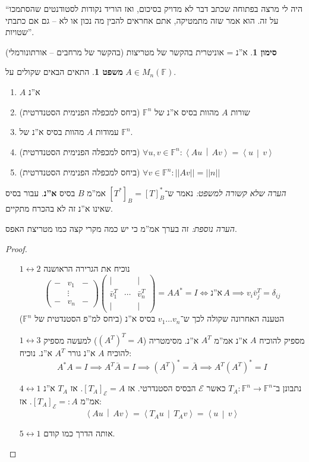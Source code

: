 \documentclass[a4paper]{article}
\newcommand\ec    {\mathcal{E}}
\newcommand\ra    {\rangle}
\newcommand\la    {\langle}
\newcommand\lra       {\leftrightarrow}
\newcommand\F         {\mathbb{F}}
\newcommand\co        {\colon}
\newcommand\pms[1]    {\begin{pmatrix}
		#1
\end{pmatrix}}
\newcommand\norm[1]   {\left \vert \left \vert #1 \right \vert \right \vert}
\newcommand\mut [2]   {\left \la #1 \,\middle|\, #2 \right \ra}
\newcommand\dg        {\delta}
\theoremstyle{definition}
\newtheorem{Theorem}{\color{myblue}משפט}
\newtheorem{Notion}{\color{myred}סימון}
\newcommand\theo  [1] {\begin{Theorem}#1\end{Theorem}}
\newcommand\noti  [1] {\begin{Notion}#1\end{Notion}}
\begin{document}
	``היה לי מרצה בפתוחה שכתב דבר לא מדויק בסיכום, ואז הוריד נקודות לסטודנטים שהסתמכו על זה. הוא אמר שזה מתמטיקה, אתם אחראים להבין מה נכון או לא – גם אם כתבתי שטויות''. 
	
	\noti{א''נ = אוניטרית בהקשר של מטריצות (בהקשר של מרחבים – אורתונורמלי)}
	
	\theo{התאים הבאים שקולים על $A \in M_n(\F)$. 
		\begin{enumerate}
			\item $A$ א''נ
			\item שורות $A$ מהוות בסיס א''נ של $\F^n$ (ביחס למכפלה הפנימית הסטנדרטית)
			\item עמודות $A$ מהוות בסיס א''נ של $\F^n$. 
			\item (ביחס למכפלה הפנימית הסטנדרטית) \hfill $\forall u, v \in \F^n \co \mut{Au}{Av} = \mut{u}{v}$
			\item (ביחס למכפלה הפנימית הסטנדרטית) \hfill $\forall v \in \F^n \co \norm{Av} = \norm{n}$
	\end{enumerate}}
	\textit{הערה שלא קשורה למשפט: }נאמר ש־$[T^*]_B = [T]_B^*$ אמ''מ $B$ בסיס \textbf{א''נ}. עבור בסיס שאינו א''נ זה לא בהכרח מתקיים. 
	
	\textit{הערה נוספת: }זה בערך אמ''מ כי יש כמה מקרי קצה כמו מטריצת האפס. 
	
	\begin{proof}\,
		\begin{itemize}
			\item[$1 \lra 2$] נוכיח את הגרירה הראושנה
			\[ \pms{- & v_1 & - \\ & \vdots \\ - & v_n & -}\pms{\vert & & \vert\\ \bar v_1^T & \cdots & \bar v_n^T \\ \vert & & \vert} = AA^* = I \iff \text{א''נ}\, A \implies v_i \bar v_j^T = \dg_{ij} \] 
			הטענה האחרונה שקולה לכך ש־$v_1 \dots v_n$ בסיס א''נ (ביחס למ''פ הסטנדטית של $\F^n$)
			\item[$1 \lra 3$]מספיק להוכיח $A$ א''נ אמ''מ $A^T$ א''נ. מסימטריה ($(A^T)^T = A$) למעשה מספיק להוכיח $A$ א''נ גורר $A^T$ א''נ. נוכיח: 
			\[ A^*A = I \implies A^T\bar A = I \implies (A^T)^* = \bar A \implies A^T(A^T)^* = I \]
			\item[$4 \lra 1$]נתבונן ב־$T_A \co \F^n \to \F^n$ כאשר $\ec$ הבסיס הסטנדרטי. אז $[T_A]_{\ec} = A$. אז $T_A$ א''נ אמ''מ $[T_A]_{\ec} =: A$. אז: 
			\[ \mut{Au}{Av} = \mut{T_Au}{T_Av} = \mut{u}{v} \]
			\item[$5 \lra 1$] אותה הדרך כמו קודם. 
		\end{itemize}
	\end{proof}
	
\end{document}
